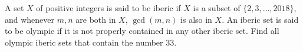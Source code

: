 A set $X$ of positive integers is said to be iberic if $X$ is a subset of $\{2, 3, \dots, 2018\}$,  and whenever $m, n$ are both in $X$,  $\gcd(m, n)$ is also in $X$. An iberic set is said to be olympic if it is not properly contained in any other iberic set. Find all olympic iberic sets that contain the number $33$.